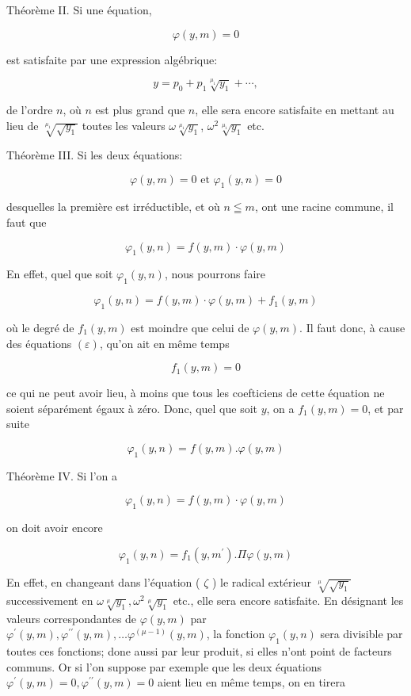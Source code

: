 \documentclass{article}
\begin{document}
Théorème II. Si une équation,

\[
\varphi(y, m)=0
\]

est satisfaite par une expression algébrique:

\[
y=p_{0}+p_{1} \sqrt[\mu_{1}]{y_{1}}+\cdots,
\]

de l'ordre \(n\), où \(n\) est plus grand que \(n\), elle sera encore satisfaite en mettant au lieu de \(\sqrt[\mu_{1}]{\sqrt{y_{1}}}\) toutes les valeurs \(\omega \sqrt[\mu_{1}]{y_{1}}\), \(\omega^{2} \sqrt[\mu_{1}]{y_{1}}\) etc.

Théorème III. Si les deux équations:

\[
\varphi(y, m)=0 \text { et } \varphi_{1}(y, n)=0
\]

desquelles la première est irréductible, et où \(n \leqq m\), ont une racine commune, il faut que

\[
\varphi_{1}(y, n)=f(y, m) \cdot \varphi(y, m)
\]

En effet, quel que soit \(\varphi_{1}(y, n)\), nous pourrons faire

\[
\varphi_{1}(y, n)=f(y, m) \cdot \varphi(y, m)+f_{1}(y, m)
\]

où le degré de \(f_{1}(y, m)\) est moindre que celui de \(\varphi(y, m)\). Il faut donc, à cause des équations \((\varepsilon)\), qu'on ait en même temps

\[
f_{1}(y, m)=0
\]

ce qui ne peut avoir lieu, à moins que tous les coefticiens de cette équation ne soient séparément égaux à zéro. Donc, quel que soit \(y\), on a \(f_{1}(y, m)=0\), et par suite

\[
\varphi_{1}(y, n)=f(y, m) . \varphi(y, m)
\]

Théorème IV. Si l'on a

\[
\varphi_{1}(y, n)=f(y, m) \cdot \varphi(y, m)
\]

on doit avoir encore

\[
\varphi_{1}(y, n)=f_{1}\left(y, m^{\prime}\right) . \Pi \varphi(y, m)
\]

En effet, en changeant dans l'équation ( \(\zeta\) ) le radical extérieur \(\sqrt[\mu]{\sqrt{y_{1}}}\) successivement en \(\omega \sqrt[\mu]{y_{1}}, \omega^{2} \sqrt[\mu]{y_{1}}\) etc., elle sera encore satisfaite. En désignant les valeurs correspondantes de \(\varphi(y, m)\) par \(\varphi^{\prime}(y, m), \varphi^{\prime \prime}(y, m), \ldots \varphi^{(\mu-1)}(y, m)\), la fonction \(\varphi_{1}(y, n)\) sera divisible par toutes ces fonctions; done aussi par leur produit, si elles n'ont point de facteurs communs. Or si l'on suppose par exemple que les deux équations \(\varphi^{\prime}(y, m)=0, \varphi^{\prime \prime}(y, m)=0\) aient lieu en même temps, on en tirera
\end{document}

